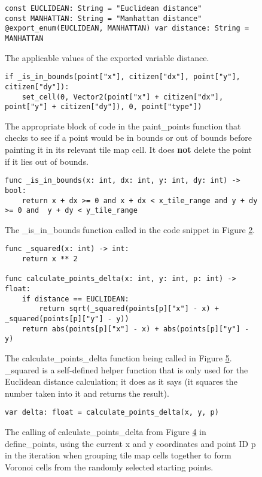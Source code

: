 \begin{figure}[H]
    \centering
    \begin{lstlisting}
const EUCLIDEAN: String = "Euclidean distance"
const MANHATTAN: String = "Manhattan distance"
@export_enum(EUCLIDEAN, MANHATTAN) var distance: String = MANHATTAN
    \end{lstlisting}
    \caption{The applicable values of the exported variable distance.}
    \label{fig:voronoi5}
\end{figure}

\begin{figure}[H]
    \centering
    \begin{lstlisting}
if _is_in_bounds(point["x"], citizen["dx"], point["y"], citizen["dy"]):
    set_cell(0, Vector2(point["x"] + citizen["dx"], point["y"] + citizen["dy"]), 0, point["type"])
    \end{lstlisting}
    \caption{The appropriate block of code in the paint\_points function that checks to see if a point would be in bounds or out of bounds before painting it in its relevant tile map cell. It does \textbf{not} delete the point if it lies out of bounds.}
    \label{fig:voronoi6}
\end{figure}

\begin{figure}[H]
    \centering
    \begin{lstlisting}
func _is_in_bounds(x: int, dx: int, y: int, dy: int) -> bool:
	return x + dx >= 0 and x + dx < x_tile_range and y + dy >= 0 and  y + dy < y_tile_range
    \end{lstlisting}
    \caption{The \_is\_in\_bounds function called in the code snippet in Figure \ref{fig:voronoi6}.}
    \label{fig:voronoi7}
\end{figure}

\begin{figure}[H]
    \centering
    \begin{lstlisting}
func _squared(x: int) -> int:
	return x ** 2

func calculate_points_delta(x: int, y: int, p: int) -> float:
	if distance == EUCLIDEAN:
		return sqrt(_squared(points[p]["x"] - x) + _squared(points[p]["y"] - y))
	return abs(points[p]["x"] - x) + abs(points[p]["y"] - y)
    \end{lstlisting}
    \caption{The calculate\_points\_delta function being called in Figure \ref{fig:voronoi9}. \_squared is a self-defined helper function that is only used for the Euclidean distance calculation; it does as it says (it squares the number taken into it and returns the result).}
    \label{fig:voronoi8}
\end{figure}

\begin{figure}
    \centering
    \begin{lstlisting}
var delta: float = calculate_points_delta(x, y, p)
    \end{lstlisting}
    \caption{The calling of calculate\_points\_delta from Figure \ref{fig:voronoi8} in define\_points, using the current x and y coordinates and point ID p in the iteration when grouping tile map cells together to form Voronoi cells from the randomly selected starting points.}
    \label{fig:voronoi9}
\end{figure}